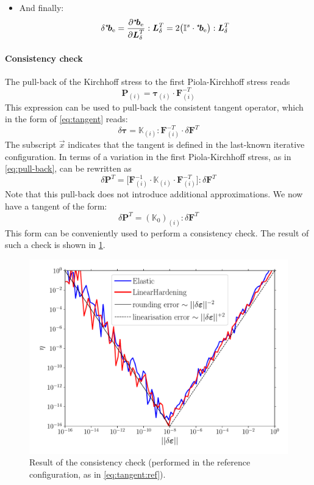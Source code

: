 \documentclass[namecite, fleqn]{goose-article}
\newcommand\ST[1]{\hspace*{-.3em}~^\star\!#1}
\newcommand\T[1]{\bm{{#1}}}
\newcommand\TT[1]{\mathbb{{#1}}}
\begin{document}
\begin{itemize}
    \item And finally:
    \begin{equation}
        \delta \ST{\T{b}}_\mathrm{e}
        = \frac{\partial \ST{\T{b}}_\mathrm{e}}{\partial \T{L}_\delta^T} : \T{L}_\delta^T
        = 2 \big( \TT{I}^s \cdot \ST{\T{b}}_\mathrm{e} \big) : \T{L}_\delta^T
    \end{equation}

\end{itemize}


\paragraph{Consistency check}

The pull-back of the Kirchhoff stress to the first Piola-Kirchhoff stress reads
\begin{equation}
    \T{P}_{(i)} = \bm{\tau}_{(i)} \cdot \T{F}^{-T}_{(i)}
\end{equation}
This expression can be used to pull-back the consistent tangent operator,
which in the form of \cref{eq:tangent} reads:
\begin{equation}
    \delta \bm{\tau}
    =
    \TT{K}_{(i)}
    : \T{F}_{(i)}^{-T} \cdot \delta \T{F}^T
    \label{eq:pull-back}
\end{equation}
The subscript $\vec{x}$ indicates that the tangent is defined
in the last-known iterative configuration.
In terms of a variation in the first Piola-Kirchhoff stress,
as in \cref{eq:pull-back}, can be rewritten as
\begin{equation}
    \delta \T{P}^T
    =
    \big[
    \T{F}_{(i)}^{-1} \cdot
    \TT{K}_{(i)}
    \cdot \T{F}_{(i)}^{-T}
    \big]
    : \delta \T{F}^T
\end{equation}
Note that this pull-back does not introduce additional approximations.
We now have a tangent of the form:
\begin{equation}
    \delta \T{P}^T = (\TT{K}_0)_{(i)} : \delta \T{F}^T
    \label{eq:tangent:ref}
\end{equation}
This form can be conveniently used to perform a consistency check.
The result of such a check is shown in \cref{fig:consistency}.

\begin{figure}[htp]
    \centering
    \includegraphics[width=.5\textwidth]{examples/consistency}
    \caption{
        Result of the consistency check
        (performed in the reference configuration, as in \cref{eq:tangent:ref}).}
    \label{fig:consistency}
\end{figure}


\end{document}
